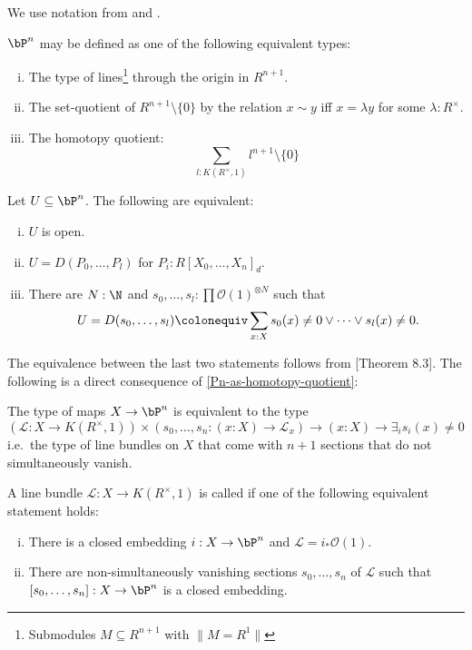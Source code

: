 
We use notation from \cite{draft} and \cite{sag-projective}.

\begin{definition}
  \label{Pn-definitions}
  $\bP^n$ may be defined as one of the following equivalent types:
  \begin{enumerate}[(i)]
  \item The type of lines\footnote{Submodules $M\subseteq R^{n+1}$ with $\| M=R^1 \|$} through the origin in $R^{n+1}$.
  \item The set-quotient of $R^{n+1}\setminus\{0\}$ by the relation $x\sim y$ iff $x=\lambda y$ for some $\lambda :R^\times$.
  \item\label{Pn-as-homotopy-quotient} The homotopy quotient:
    \[
      \sum_{l : K(R^\times,1)} l^{n+1}\setminus\{0\}
    \]
  \end{enumerate}
\end{definition}

\begin{lemma}
  \label{D-for-Pn}
  Let $U\subseteq \bP^n$.
  The following are equivalent:
  \begin{enumerate}[(i)]
  \item $U$ is open.
  \item $U=D(P_0,\dots,P_l)$ for $P_i:R[X_0,\dots,X_n]_d$.
  \item There are $N:\N$ and $s_0,\dots,s_l:\prod \mathcal O(1)^{\otimes N}$ such that
    \[
      U=D(s_0,\dots,s_l)\colonequiv\sum_{x:X}s_0(x)\neq 0\vee \dots \vee s_l(x)\neq 0
      \rlap{.}
    \]
  \end{enumerate}
\end{lemma}

The equivalence between the last two statements follows from \cite{cech-draft}[Theorem 8.3].
The following is a direct consequence of  \ref{Pn-as-homotopy-quotient}:

\begin{remark}
  The type of maps $X\to \bP^n$ is equivalent to the type
  \[
  (\mathcal L:X\to K(R^\times,1))\times (s_0,\dots,s_n:(x:X)\to \mathcal L_x) \to (x:X) \to \exists_{i} s_i(x)\neq 0
  \]
  i.e.\ the type of line bundles on $X$ that come with $n+1$ sections that do not simultaneously vanish.
\end{remark}

\begin{definition}
  A line bundle $\mathcal L:X\to K(R^\times,1)$ is called 
  if one of the following equivalent statement holds:
  \begin{enumerate}[(i)]
  \item There is a closed embedding $i:X\to \bP^n$ and $\mathcal L=i_\ast \mathcal O(1)$.
  \item There are non-simultaneously vanishing sections $s_0,\dots,s_n$ of $\mathcal L$
    such that $[s_0,\dots,s_n]:X\to \bP^n$ is a closed embedding.
  \end{enumerate}
\end{definition}

